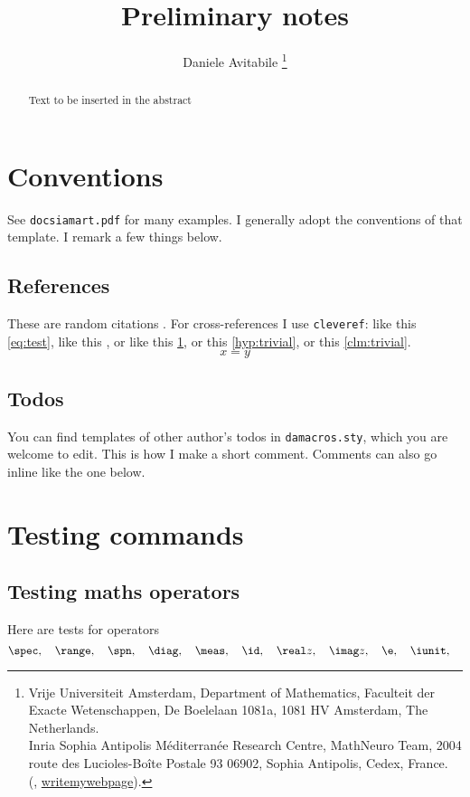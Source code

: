 \documentclass[a4paper]{siamart190516}
\title{Preliminary notes}
\author{%
  Daniele Avitabile%
  \thanks{%
    Vrije Universiteit Amsterdam,
    Department of Mathematics,
    Faculteit der Exacte Wetenschappen,
    De Boelelaan 1081a,
    1081 HV Amsterdam, The Netherlands.
  \protect\\
    Inria Sophia Antipolis M\'editerran\'ee Research Centre,
    MathNeuro Team,
    2004 route des Lucioles-Boîte Postale 93 06902,
    Sophia Antipolis, Cedex, France.
  \protect\\
    (\email{d.avitabile@vu.nl}, \url{writemywebpage}).
  }
}
\begin{document}
\maketitle

\begin{abstract}
  Text to be inserted in the abstract
\end{abstract}

\section{Conventions} \label{sec:conventions}
See \texttt{docsiamart.pdf} for many examples. I generally adopt the conventions of
that template. I remark a few things below.

\subsection{References} \label{sec:references}
These are random citations \cite{KoMa14,siam}. For cross-references I use
\texttt{cleveref}: like this
\cref{eq:test}, like this , or like this \cref{sec:conventions}, or
this \cref{hyp:trivial}, or this \cref{clm:trivial}.
\begin{equation}\label{eq:test}
  x = y
\end{equation}


\subsection{Todos}
You can find templates of other author's todos in
\texttt{damacros.sty}, which you are welcome to edit.
This is how I make a short comment. Comments can also go
inline like the one below.
% 

\section{Testing commands}

\subsection{Testing maths operators}
Here are tests for operators
\[
  \spec, \quad 
  \range, \quad 
  \spn, \quad
  \diag, \quad
  \meas, \quad
  \id, \quad
  \real z, \quad
  \imag z, \quad
  \e, \quad
  \iunit, \quad
\]
\end{document}
